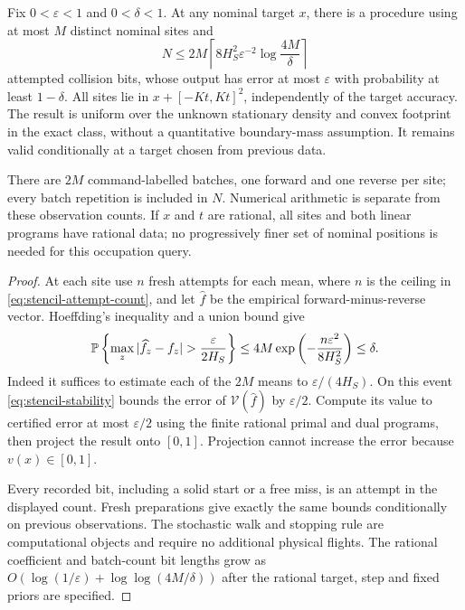 \begin{theorem}
\label{thm:stencil-sampling}
Fix $0<\varepsilon<1$ and $0<\delta<1$. At any nominal target $x$,
there is a procedure using at most $M$ distinct nominal sites and
\begin{equation}\label{eq:stencil-attempt-count}
 N\le 2M\left\lceil
       8H_S^2\varepsilon^{-2}\log\frac{4M}{\delta}
                         \right\rceil
\end{equation}
attempted collision bits, whose output has error at most
$\varepsilon$ with probability at least $1-\delta$. All sites lie
in $x+[-Kt,Kt]^2$, independently of the target accuracy. The result
is uniform over the unknown stationary density and convex footprint
in the exact class, without a quantitative boundary-mass assumption.
It remains valid conditionally at a target chosen from previous data.

There are $2M$ command-labelled batches, one forward and one reverse
per site; every batch repetition is included in $N$. Numerical
arithmetic is separate from these observation counts. If $x$ and $t$
are rational, all sites and both linear programs have rational data;
no progressively finer set of nominal positions is needed for this
occupation query.
\end{theorem}
\begin{proof}
At each site use $n$ fresh attempts for each mean, where $n$ is the
ceiling in \eqref{eq:stencil-attempt-count}, and let $\widehat f$
be the empirical forward-minus-reverse vector. Hoeffding's inequality
and a union bound give
\[
 \Prob\left\{\max_z|\widehat f_z-f_z|>
                      \frac{\varepsilon}{2H_S}\right\}
 \le4M\exp\left(-\frac{n\varepsilon^2}{8H_S^2}\right)
 \le\delta.
\]
Indeed it suffices to estimate each of the $2M$ means to
$\varepsilon/(4H_S)$. On this event
\eqref{eq:stencil-stability} bounds the error of
$\mathcal V(\widehat f)$ by $\varepsilon/2$. Compute its value to
certified error at most $\varepsilon/2$ using the finite rational
primal and dual programs, then project the result onto $[0,1]$.
Projection cannot increase the error because $v(x)\in[0,1]$.

Every recorded bit, including a solid start or a free miss, is an
attempt in the displayed count. Fresh preparations give exactly the
same bounds conditionally on previous observations. The stochastic
walk and stopping rule are computational objects and require no
additional physical flights. The rational coefficient and batch-count
bit lengths grow as $O(\log(1/\varepsilon)+\log\log(4M/\delta))$
after the rational target, step and fixed priors are specified.
\end{proof}

